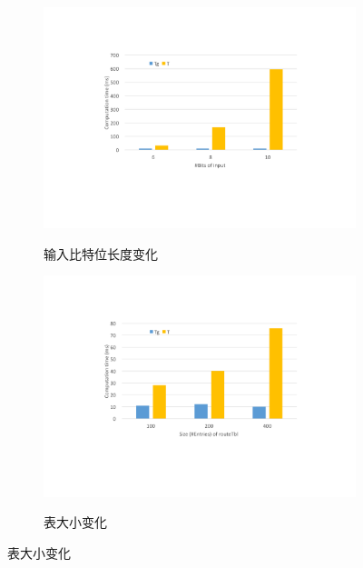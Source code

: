 \begin{figure}
  \centering

  \begin{subfigure}[b]{0.4\textwidth}
      \includegraphics[width=\textwidth]{figures/figure-eval-t1.pdf}
      \label{cap:fig:eval-ct:a}
      \caption{输入比特位长度变化}
  \end{subfigure}

  \hspace{1in}

  \begin{subfigure}[b]{0.4\textwidth}
      \includegraphics[width=\textwidth]{figures/figure-eval-t2.pdf}
      \label{cap:fig:eval-ct:b}
      \caption{表大小变化}  %
  \end{subfigure}

  \label{cap:fig:eval-ct}
\end{figure}




